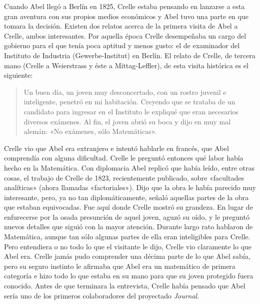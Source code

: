 \documentclass[a4paper, 12pt, draft]{article}
\begin{document}
Cuando Abel llegó a Berlín en 1825, Crelle estaba pensando en lanzarse a esta gran aventura con sus propios medios económicos y Abel tuvo una parte en que tomara la decisión. Existen dos relatos acerca de la primera visita de Abel a Crelle, ambos interesantes. Por aquella época Crelle desempeñaba un cargo del gobierno para el que tenía poca aptitud y menos gusto: el de examinador del Instituto de Industria (Gewerbe-Institut) en Berlín. El relato de Crelle, de tercera mano (Crelle a Weierstrass y éste a Mittag-Leffler), de esta visita histórica es el siguiente:

\begin{quote}\small

Un buen día, un joven muy desconcertado, con un rostro juvenil e inteligente, penetró en mi habitación. Creyendo que se trataba de un candidato para ingresar en el Instituto le expliqué que eran necesarios diversos exámenes. Al fin, el joven abrió su boca y dijo en muy mal alemán: «No exámenes, sólo Matemáticas».

\end{quote}

Crelle vio que Abel era extranjero e intentó hablarle en francés, que Abel comprendía con alguna dificultad. Crelle le preguntó entonces qué labor había hecho en la Matemática. Con diplomacia Abel replicó que había leído, entre otras cosas, el trabajo de Crelle de 1823, recientemente publicado, sobre «facultades analíticas» (ahora llamadas «factoriales»). Dijo que la obra le había parecido muy interesante, pero, ya no tan diplomáticamente, señaló aquellas partes de la obra que estaban equivocadas. Fue aquí donde Crelle mostró su grandeza. En lugar de enfurecerse por la osada presunción de aquel joven, aguzó su oído, y le preguntó nuevos detalles que siguió con la mayor atención. Durante largo rato hablaron de Matemática, aunque tan sólo algunas partes de ella eran inteligibles para Crelle. Pero entendiera o no todo lo que el visitante le dijo, Crelle vio claramente lo que Abel era. Crelle jamás pudo comprender una décima parte de lo que Abel sabía, pero su seguro instinto le afirmaba que Abel era un matemático de primera categoría e hizo todo lo que estaba en su mano para que su joven protegido fuera conocido. Antes de que terminara la entrevista, Crelle había pensado que Abel sería uno de los primeros colaboradores del proyectado {\it Journal}.
\end{document}
